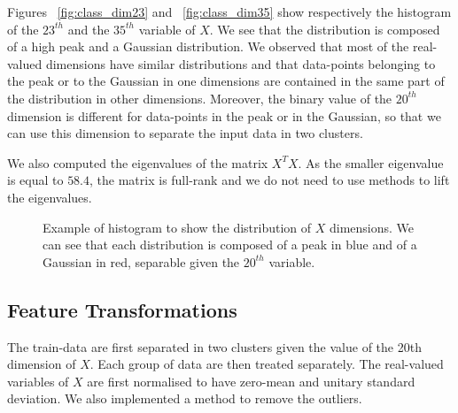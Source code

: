\documentclass{article} %
\begin{document}
Figures ~\ref{fig:class_dim23} and ~\ref{fig:class_dim35} show respectively the histogram of the $23^{th}$ and the $35^{th}$ variable of $X$. We see that the distribution is composed of a high peak and a Gaussian distribution. We observed that most of the real-valued dimensions have similar distributions and that data-points belonging to the peak or to the Gaussian in one dimensions are contained in the same part of the distribution in other dimensions. Moreover, the binary value of the $20^{th}$ dimension is different for data-points in the peak or in the Gaussian, so that we can use this dimension to separate the input data in two clusters.

We also computed the eigenvalues of the matrix $X^{T}X$. As the smaller eigenvalue is equal to $58.4$, the matrix is full-rank and we do not need to use methods to lift the eigenvalues.

\begin{figure}[!h] %
	\center
	\hfill
	\caption{Example of histogram to show the distribution of $X$ dimensions. We can see that each distribution is composed of a peak in blue and of a Gaussian in red, separable given the $20^{th}$ variable.}
\end{figure}

\subsection{Feature Transformations}
The train-data are first separated in two clusters given the value of the 20th dimension of $X$. Each group of data are then treated separately. The real-valued variables of $X$ are first normalised to have zero-mean and unitary standard deviation. We also implemented a method to remove the outliers.
\end{document}
